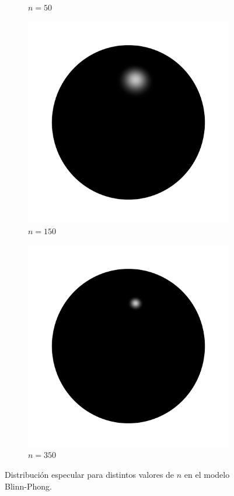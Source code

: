 \begin{figure}[H]
\begin{subfigure}[t]{0.25\textwidth}
		\caption*{$n = 50$}
	\end{subfigure}%
	\begin{subfigure}[t]{0.25\textwidth}
		\centering
		\captionsetup{justification=centering}
		\includegraphics[width=\linewidth]{media/blinn_150.png}
		\caption*{$n = 150$}
	\end{subfigure}%
	\begin{subfigure}[t]{0.25\textwidth}
		\centering
		\captionsetup{justification=centering}
		\includegraphics[width=\linewidth]{media/blinn_350.png}
		\caption*{$n = 350$}
	\end{subfigure}%
	\caption{Distribución especular para distintos valores de $n$ en el modelo Blinn-Phong.}
	\label{fig:blinn_spec_comparison}
\end{figure}

